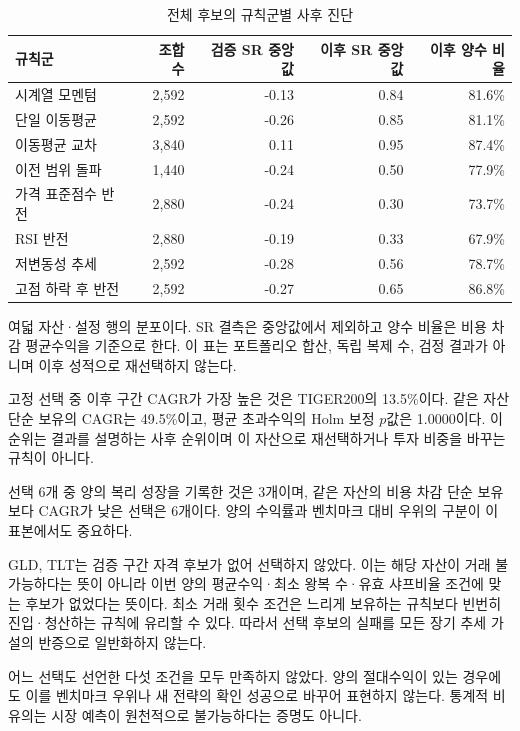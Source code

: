\documentclass[11pt,a4paper]{article}
\begin{document}
\begin{table}[htbp]\centering
\footnotesize
\setlength{\tabcolsep}{4pt}
\caption{전체 후보의 규칙군별 사후 진단}
\begin{tabular}{lrrrr}
\toprule
규칙군 & 조합 수 & 검증 SR 중앙값 & 이후 SR 중앙값 & 이후 양수 비율 \\
\midrule
시계열 모멘텀 & 2,592 & -0.13 & 0.84 & 81.6\% \\
단일 이동평균 & 2,592 & -0.26 & 0.85 & 81.1\% \\
이동평균 교차 & 3,840 & 0.11 & 0.95 & 87.4\% \\
이전 범위 돌파 & 1,440 & -0.24 & 0.50 & 77.9\% \\
가격 표준점수 반전 & 2,880 & -0.24 & 0.30 & 73.7\% \\
RSI 반전 & 2,880 & -0.19 & 0.33 & 67.9\% \\
저변동성 추세 & 2,592 & -0.28 & 0.56 & 78.7\% \\
고점 하락 후 반전 & 2,592 & -0.27 & 0.65 & 86.8\% \\
\bottomrule
\end{tabular}
\par\smallskip\begin{minipage}{\linewidth}\footnotesize 여덟 자산·설정 행의 분포이다. SR 결측은 중앙값에서 제외하고 양수 비율은 비용 차감 평균수익을 기준으로 한다. 이 표는 포트폴리오 합산, 독립 복제 수, 검정 결과가 아니며 이후 성적으로 재선택하지 않는다.\end{minipage}
\end{table}
고정 선택 중 이후 구간 CAGR가 가장 높은 것은 TIGER200의 13.5\%이다. 같은 자산 단순 보유의 CAGR는 49.5\%이고, 평균 초과수익의 Holm 보정 $p$값은 1.0000이다. 이 순위는 결과를 설명하는 사후 순위이며 이 자산으로 재선택하거나 투자 비중을 바꾸는 규칙이 아니다.

선택 6개 중 양의 복리 성장을 기록한 것은 3개이며, 같은 자산의 비용 차감 단순 보유보다 CAGR가 낮은 선택은 6개이다. 양의 수익률과 벤치마크 대비 우위의 구분이 이 표본에서도 중요하다.

GLD, TLT는 검증 구간 자격 후보가 없어 선택하지 않았다. 이는 해당 자산이 거래 불가능하다는 뜻이 아니라 이번 양의 평균수익·최소 왕복 수·유효 샤프비율 조건에 맞는 후보가 없었다는 뜻이다. 최소 거래 횟수 조건은 느리게 보유하는 규칙보다 빈번히 진입·청산하는 규칙에 유리할 수 있다. 따라서 선택 후보의 실패를 모든 장기 추세 가설의 반증으로 일반화하지 않는다.

어느 선택도 선언한 다섯 조건을 모두 만족하지 않았다. 양의 절대수익이 있는 경우에도 이를 벤치마크 우위나 새 전략의 확인 성공으로 바꾸어 표현하지 않는다. 통계적 비유의는 시장 예측이 원천적으로 불가능하다는 증명도 아니다.
\end{document}
